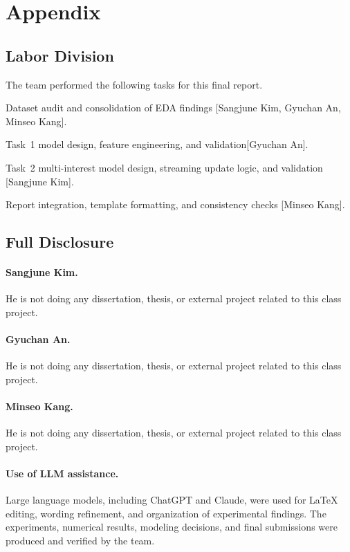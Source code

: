 \documentclass[sigconf, nonacm]{acmart}
\begin{document}
\newpage
\appendix
\section{Appendix}

\subsection{Labor Division}

The team performed the following tasks for this final report.

\bit
\item Dataset audit and consolidation of EDA findings
      [Sangjune Kim, Gyuchan An, Minseo Kang].
\item Task~1 model design, feature engineering, and validation[Gyuchan An].
\item Task~2 multi-interest model design, streaming update logic, and
      validation 
      [Sangjune Kim].
\item Report integration, template formatting, and consistency checks
      [Minseo Kang].
\eit

\subsection{Full Disclosure}

\paragraph{Sangjune Kim.}
He is not doing any dissertation, thesis, or external project related to this 
class project.

\paragraph{Gyuchan An.}
He is not doing any dissertation, thesis, or external project related to this 
class project.

\paragraph{Minseo Kang.}
He is not doing any dissertation, thesis, or external project related to this 
class project.

\paragraph{Use of LLM assistance.}
Large language models, including ChatGPT and Claude, were used for LaTeX editing, wording refinement, and organization
of experimental findings.  The experiments, numerical results, modeling
decisions, and final submissions were produced and verified by the
team.
\end{document}
